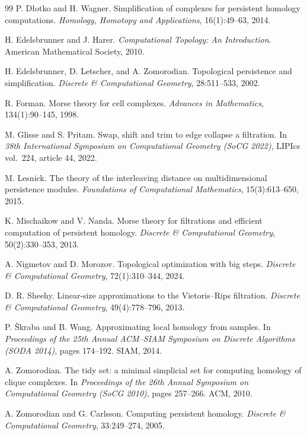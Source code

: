 \documentclass[11pt,letterpaper]{article}
\theoremstyle{definition}
\begin{document}
\begin{thebibliography}{99}
P. D\l{}otko and H. Wagner.
\newblock Simplification of complexes for persistent homology computations.
\newblock \emph{Homology, Homotopy and Applications}, 16(1):49--63, 2014.

H. Edelsbrunner and J. Harer.
\newblock \emph{Computational Topology: An Introduction}.
\newblock American Mathematical Society, 2010.

H. Edelsbrunner, D. Letscher, and A. Zomorodian.
\newblock Topological persistence and simplification.
\newblock \emph{Discrete \& Computational Geometry}, 28:511--533, 2002.

R. Forman.
\newblock Morse theory for cell complexes.
\newblock \emph{Advances in Mathematics}, 134(1):90--145, 1998.

M. Glisse and S. Pritam.
\newblock Swap, shift and trim to edge collapse a filtration.
\newblock In \emph{38th International Symposium on Computational Geometry (SoCG 2022)}, LIPIcs vol.\ 224, article 44, 2022.

M. Lesnick.
\newblock The theory of the interleaving distance on multidimensional persistence modules.
\newblock \emph{Foundations of Computational Mathematics}, 15(3):613--650, 2015.

K. Mischaikow and V. Nanda.
\newblock Morse theory for filtrations and efficient computation of persistent homology.
\newblock \emph{Discrete \& Computational Geometry}, 50(2):330--353, 2013.

A. Nigmetov and D. Morozov.
\newblock Topological optimization with big steps.
\newblock \emph{Discrete \& Computational Geometry}, 72(1):310--344, 2024.

D. R. Sheehy.
\newblock Linear-size approximations to the Vietoris--Rips filtration.
\newblock \emph{Discrete \& Computational Geometry}, 49(4):778--796, 2013.

P. \v{S}kraba and B. Wang.
\newblock Approximating local homology from samples.
\newblock In \emph{Proceedings of the 25th Annual ACM--SIAM Symposium on Discrete Algorithms (SODA 2014)}, pages 174--192. SIAM, 2014.

A. Zomorodian.
\newblock The tidy set: a minimal simplicial set for computing homology of clique complexes.
\newblock In \emph{Proceedings of the 26th Annual Symposium on Computational Geometry (SoCG 2010)}, pages 257--266. ACM, 2010.

A. Zomorodian and G. Carlsson.
\newblock Computing persistent homology.
\newblock \emph{Discrete \& Computational Geometry}, 33:249--274, 2005.

\end{thebibliography}
\end{document}
